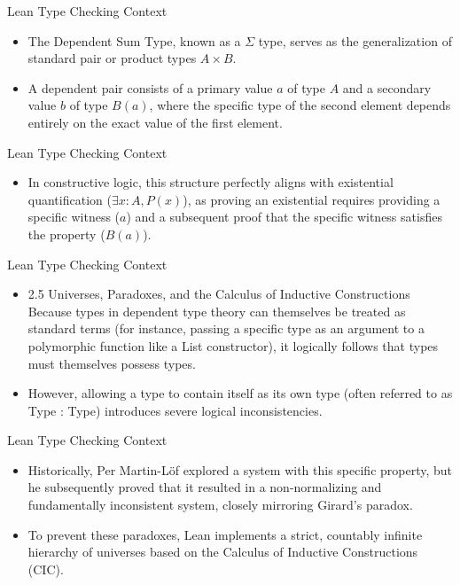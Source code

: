 \documentclass[10pt]{beamer}
\begin{document}
\begin{frame}{Lean Type Checking Context}
\begin{itemize}\setlength{\itemsep}{1.5em}
  \item The Dependent Sum Type, known as a $\Sigma$ type, serves as the generalization of standard pair or product types $A \times B$.
  \item A dependent pair consists of a primary value $a$ of type $A$ and a secondary value $b$ of type $B(a)$, where the specific type of the second element depends entirely on the exact value of the first element.
\end{itemize}
\end{frame}

\begin{frame}{Lean Type Checking Context}
\begin{itemize}\setlength{\itemsep}{1.5em}
  \item In constructive logic, this structure perfectly aligns with existential quantification ($\exists x : A, P(x)$), as proving an existential requires providing a specific witness ($a$) and a subsequent proof that the specific witness satisfies the property ($B(a)$).
\end{itemize}
\end{frame}

\begin{frame}{Lean Type Checking Context}
\begin{itemize}\setlength{\itemsep}{1.5em}
  \item 2.5 Universes, Paradoxes, and the Calculus of Inductive Constructions Because types in dependent type theory can themselves be treated as standard terms (for instance, passing a specific type as an argument to a polymorphic function like a List constructor), it logically follows that types must themselves possess types.
  \item However, allowing a type to contain itself as its own type (often referred to as Type : Type) introduces severe logical inconsistencies.
\end{itemize}
\end{frame}

\begin{frame}{Lean Type Checking Context}
\begin{itemize}\setlength{\itemsep}{1.5em}
  \item Historically, Per Martin-Löf explored a system with this specific property, but he subsequently proved that it resulted in a non-normalizing and fundamentally inconsistent system, closely mirroring Girard's paradox.
  \item To prevent these paradoxes, Lean implements a strict, countably infinite hierarchy of universes based on the Calculus of Inductive Constructions (CIC).
\end{itemize}
\end{frame}
\end{document}
